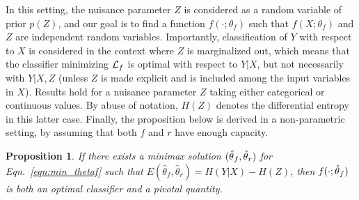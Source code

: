 \documentclass[twocolumn,superscriptaddress,aps]{revtex4-1}
\theoremstyle{plain}
\newtheorem{proposition}[theorem]{Proposition}
\begin{document}
In this setting, the nuisance parameter $Z$ is considered as a random variable
of prior $p(Z)$, and our goal is to find a function
$f(\cdot;\theta_f)$ such that $f(X;\theta_f)$ and $Z$ are independent random
variables.   Importantly, classification of $Y$ with respect to $X$ is
considered in the context where $Z$ is marginalized out, which means that the
classifier minimizing ${\cal L}_f$ is optimal with respect to $Y|X$, but not
necessarily with $Y|X,Z$ (unless $Z$ is made explicit and is included among the
input variables in $X$). Results hold for a nuisance parameter $Z$ taking either
categorical or continuous values. By abuse of notation, $H(Z)$ denotes the
differential entropy in this latter case. Finally, the  proposition below is
derived in a non-parametric setting, by assuming that both $f$ and $r$ have
enough capacity.

\begin{proposition}\label{prop:2}
If there exists a minimax solution $(\smash{\hat\theta}_f, \smash{\hat\theta}_r)$
for Eqn.~\ref{eqn:min_thetaf} such that
$E(\hat\theta_f, \hat\theta_r) = H({Y|X}) - H(Z)$, then
$f(\cdot;\smash{\hat\theta}_f)$ is both an optimal classifier and a pivotal
quantity.
\end{proposition}
\end{document}
